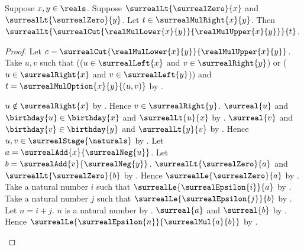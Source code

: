 \begin{theorem}\label{positive_reals_mul_right_option_above_cut}
    Suppose $x,y\in\reals$.
    Suppose $\surrealLt{\surrealZero}{x}$ and
        $\surrealLt{\surrealZero}{y}$.
    Let $t\in\surrealMulRight{x}{y}$.
    Then
        $\surrealLt
            {\surrealCut{\realMulLower{x}{y}}{\realMulUpper{x}{y}}}{t}$.
\end{theorem}
\begin{proof}
    Let $c=\surrealCut{\realMulLower{x}{y}}{\realMulUpper{x}{y}}$.
    Take $u,v$ such that
        (($u\in\surrealLeft{x}$ and $v\in\surrealRight{y}$) or
         ($u\in\surrealRight{x}$ and $v\in\surrealLeft{y}$)) and
        $t=\surrealMulOption{x}{y}{(u,v)}$
        by .
    \begin{byCase}
            $u\notin\surrealRight{x}$
                by
                .
            Hence $v\in\surrealRight{y}$.
            $\surreal{u}$ and $\birthday{u}\in\birthday{x}$ and
                $\surrealLt{u}{x}$
                by .
            $\surreal{v}$ and $\birthday{v}\in\birthday{y}$ and
                $\surrealLt{y}{v}$
                by .
            Hence $u,v\in\surrealStage{\naturals}$
                by .
            Let $a=\surrealAdd{x}{\surrealNeg{u}}$.
            Let $b=\surrealAdd{v}{\surrealNeg{y}}$.
            $\surrealLt{\surrealZero}{a}$ and
                $\surrealLt{\surrealZero}{b}$
                by
                .
            Hence $\surrealLe{\surrealZero}{a}$
                by .
            Take a natural number $i$ such that
                $\surrealLe{\surrealEpsilon{i}}{a}$
                by .
            Take a natural number $j$ such that
                $\surrealLe{\surrealEpsilon{j}}{b}$
                by .
            Let $n=i+j$.
            $n$ is a natural number
                by .
            $\surreal{a}$ and $\surreal{b}$
                by
                .
            Hence
                $\surrealLe{\surrealEpsilon{n}}{\surrealMul{a}{b}}$
                by .

\end{byCase}
\end{proof}
